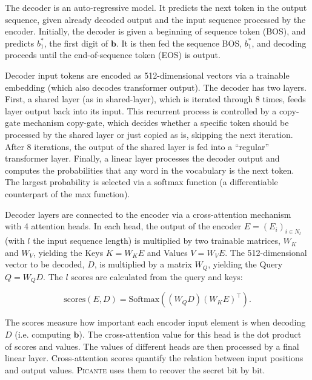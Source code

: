 \documentclass{article}
\begin{document}
The decoder is an auto-regressive model. It predicts the next token in the output sequence, given already decoded output and the input sequence processed by the encoder. Initially, the decoder is given a beginning of sequence token (BOS), and predicts $b_1^*$, the first digit of $\mathbf{b}$. It is then fed the sequence BOS, $b_1^*$, and decoding proceeds until the end-of-sequence token (EOS) is output.

Decoder input tokens are encoded as 512-dimensional vectors via a trainable embedding (which also decodes transformer output). The decoder has two layers. First, a shared layer (as in shared-layer), which is iterated through 8 times, feeds layer output back into its input. This recurrent process is controlled by a copy-gate mechanism copy-gate, which decides whether a specific token should be processed by the shared layer or just copied as is, skipping the next iteration. After 8 iterations, the output of the shared layer is fed into a “regular” transformer layer. Finally, a linear layer processes the decoder output and computes the probabilities that any word in the vocabulary is the next token. The largest probability is selected via a softmax function (a differentiable counterpart of the max function).

Decoder layers are connected to the encoder via a cross-attention mechanism with 4 attention heads. In each head, the output of the encoder $E = (E_i)_{i \in N_l}$ (with $l$ the input sequence length) is multiplied by two trainable matrices, $W_K$ and $W_V$, yielding the Keys $K = W_K E$ and Values $V = W_V E$. The 512-dimensional vector to be decoded, $D$, is multiplied by a matrix $W_Q$, yielding the Query $Q = W_Q D$. The $l$ scores are calculated from the query and keys:

\[
\text{scores}(E, D) = \text{Softmax}((W_Q D)(W_K E)^\top).
\]

The scores measure how important each encoder input element is when decoding $D$ (i.e. computing $\mathbf{b}$). The cross-attention value for this head is the dot product of scores and values. The values of different heads are then processed by a final linear layer. Cross-attention scores quantify the relation between input positions and output values. \textsc{Picante} uses them to recover the secret bit by bit.
\end{document}
